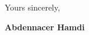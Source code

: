 \documentclass[11pt]{letter}
\begin{document}
Yours sincerely,

\begin{flushleft}
 {\bfseries Abdennacer Hamdi}
 \end{flushleft}
 \vfill
 
\end{document}
